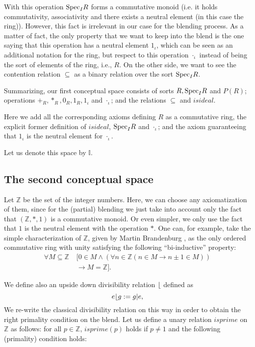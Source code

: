 With this operation ${\rm Spec}_IR$ forms a commutative monoid
(i.e. it holds commutativity, associativity and there exists a neutral
element (in this case the ring)). However, this fact is irrelevant in
our case for the blending process. As a matter of fact, the only
property that we want to keep into the blend is the one saying that
this operation has a neutral element $1_{\iota}$, which can be seen as
an additional notation for the ring, but respect to this operation
$\cdot_{\iota}$ instead of being the sort of elements of the ring,
i.e., $R$.  \newline\indent On the other side, we want to see the
contention relation $\subseteq$ as a binary relation over the sort
${\rm Spec}_IR$.

Summarizing, our first conceptual space consists of sorts $R, {\rm Spec}_IR$ and $P(R)$; operations $+_R, *_R, 0_R, 1_R, 1_{\iota}$ and $
\cdot_{\iota}$; and the relations $\subseteq$ and $isideal$.

Here we add all the corresponding axioms defining $R$ as a commutative ring, the explicit former definition of $isideal$, ${\rm Spec}_IR$ and $\cdot_{\iota}$; and the axiom guaranteeing that  $1_{\iota}$ is the neutral element for $\cdot_{\iota}$.
 
Let us denote this space by $\mathbb{I}$.

\subsection{The second conceptual space}
Let $\mathbb{Z}$ be the set of the integer numbers. Here, we can
choose any axiomatization of them, since for the (partial) blending we
just take into account only the fact that $(\mathbb{Z},*,1)$ is a
commutative monoid. Or even simpler, we only use the fact that $1$ is
the neutral element with the operation $*$. One can, for example, take
the simple characterization of $\mathbb{Z}$, given by Martin
Brandenburg \citep{brandenburgdobleinduction}, as the only ordered
commutative ring with unity satisfying the following ``bi-inductive''
property:
\begin{align*}
  \label{eq:int}
  \forall M \subseteq \mathbb{Z}\;  & [ 0 \in M \wedge (\forall n \in \mathbb{Z} (n\in M \rightarrow n\pm 1 \in M))\\
  & \rightarrow M=\mathbb{Z}].
\end{align*}

We define also an upside down divisibility relation $\lfloor$ defined as 
\[e\lfloor g:=g|e,\] We re-write the classical divisibility
relation on this way in order to obtain the right primality condition
on the blend.  Let us define a unary relation $isprime$ on
$\mathbb{Z}$ as follows: for all $p\in \mathbb{Z}$, $isprime(p)$ holds
if $p\neq 1$ and the following (primality) condition holds:

